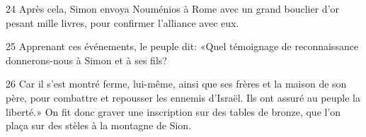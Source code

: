 

24 Après cela, Simon envoya Nouménios à Rome avec un grand bouclier d’or pesant mille livres, pour confirmer l’alliance avec eux.

25 Apprenant ces événements, le peuple dit: «Quel témoignage de reconnaissance donnerons-nous à Simon et à ses fils?

26 Car il s’est montré ferme, lui-même, ainsi que ses frères et la maison de son père, pour combattre et repousser les ennemis d’Israël. Ils ont assuré au peuple la liberté.» On fit donc graver une inscription sur des tables de bronze, que l’on plaça sur des stèles à la montagne de Sion.